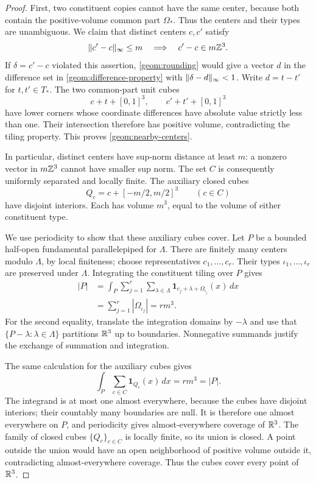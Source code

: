 \begin{proof}
First, two constituent copies cannot have the same center, because
both contain the positive-volume common part $\Omega_*$.  Thus the
centers and their types are unambiguous.  We claim that distinct
centers $c,c'$ satisfy
\begin{equation}
 \lVert c'-c\rVert_\infty\leq m
 \quad\Longrightarrow\quad c'-c\in m\mathbb Z^3.
 \label{geom:nearby-centers}
\end{equation}
If $\delta=c'-c$ violated this assertion, \cref{geom:rounding} would
give a vector $d$ in the difference set in
\eqref{geom:difference-property} with
$\lVert\delta-d\rVert_\infty<1$.  Write $d=t-t'$ for $t,t'\in T_*$.  The
two common-part unit cubes
\[
 c+t+[0,1]^3,\qquad c'+t'+[0,1]^3
\]
have lower corners whose coordinate differences have absolute
value strictly less than one.  Their intersection therefore has
positive volume, contradicting the tiling property.  This proves
\cref{geom:nearby-centers}.

In particular, distinct centers have sup-norm distance at least
$m$: a nonzero vector in $m\mathbb Z^3$ cannot have smaller sup norm.
The set $C$ is consequently uniformly separated and locally finite.
The auxiliary closed cubes
\[
 Q_c=c+[-m/2,m/2]^3\qquad(c\in C)
\]
have disjoint interiors.  Each has volume $m^3$, equal to the
volume of either constituent type.

We use periodicity to show that these auxiliary cubes cover.  Let
$P$ be a bounded half-open fundamental parallelepiped for $\Lambda$.
There are finitely many centers modulo $\Lambda$, by local
finiteness; choose representatives $c_1,\ldots,c_r$.  Their types
$\iota_1,\ldots,\iota_r$ are preserved under $\Lambda$.  Integrating
the constituent tiling over $P$ gives
\begin{align*}
 |P|
 &=\int_P\sum_{j=1}^r\sum_{\lambda\in\Lambda}
       \mathbf{1}_{c_j+\lambda+\Omega_{\iota_j}}(x)\,dx\\
 &=\sum_{j=1}^r|\Omega_{\iota_j}|=rm^3.
\end{align*}
For the second equality, translate the integration domains by
$-\lambda$ and use that $\{P-\lambda:\lambda\in\Lambda\}$ partitions
$\mathbb R^3$ up to boundaries.  Nonnegative summands justify the exchange
of summation and integration.

The same calculation for the auxiliary cubes gives
\[
 \int_P\sum_{c\in C}\mathbf{1}_{Q_c}(x)\,dx=rm^3=|P|.
\]
The integrand is at most one almost everywhere, because the cubes
have disjoint interiors; their countably many boundaries are null.
It is therefore one almost everywhere on $P$, and periodicity gives
almost-everywhere coverage of $\mathbb R^3$.  The family of closed cubes
$\{Q_c\}_{c\in C}$ is locally finite, so its union is closed.  A
point outside the union would have an open neighborhood of positive
volume outside it, contradicting almost-everywhere coverage.  Thus
the cubes cover every point of $\mathbb R^3$.


\end{proof}

